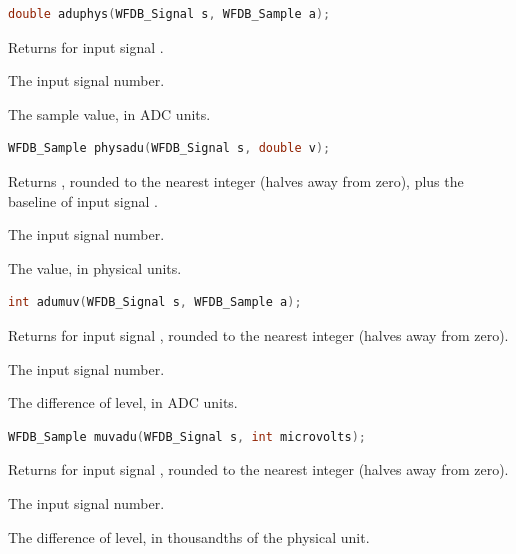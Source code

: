 \begin{lstlisting}[language=C,style=signature]
double aduphys(WFDB_Signal s, WFDB_Sample a);
\end{lstlisting}
Returns  for input signal .
\begin{params}
\item[s] The input signal number.
\item[a] The sample value, in ADC units.
\end{params}

\begin{lstlisting}[language=C,style=signature]
WFDB_Sample physadu(WFDB_Signal s, double v);
\end{lstlisting}
Returns , rounded to the nearest integer (halves away from
zero), plus the baseline of input signal .
\begin{params}
\item[s] The input signal number.
\item[v] The value, in physical units.
\end{params}

\begin{lstlisting}[language=C,style=signature]
int adumuv(WFDB_Signal s, WFDB_Sample a);
\end{lstlisting}
Returns  for input signal , rounded to the
nearest integer (halves away from zero).
\begin{params}
\item[s] The input signal number.
\item[a] The difference of level, in ADC units.
\end{params}

\begin{lstlisting}[language=C,style=signature]
WFDB_Sample muvadu(WFDB_Signal s, int microvolts);
\end{lstlisting}
Returns  for input signal , rounded to
the nearest integer (halves away from zero).
\begin{params}
\item[s] The input signal number.
\item[microvolts] The difference of level, in thousandths of the physical
  unit.
\end{params}

